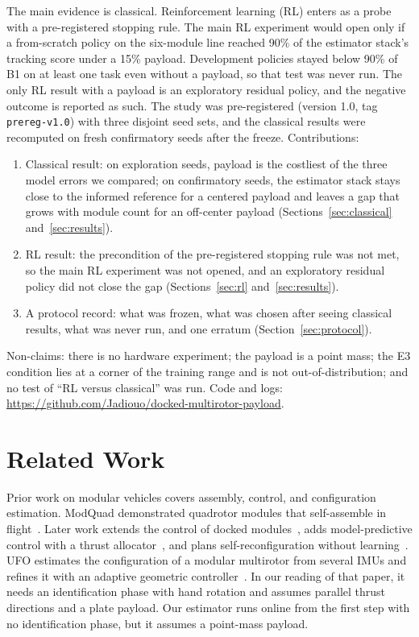 \documentclass[conference]{IEEEtran}
\begin{document}
The main evidence is classical.
Reinforcement learning (RL) enters as a probe with a pre-registered stopping rule.
The main RL experiment would open only if a from-scratch policy on the six-module line reached 90\% of the estimator stack's tracking score under a 15\% payload. %
Development policies stayed below 90\% of B1 on at least one task even without a payload, so that test was never run. %
The only RL result with a payload is an exploratory residual policy, and the negative outcome is reported as such.
The study was pre-registered (version 1.0, tag \texttt{prereg-v1.0}) with three disjoint seed sets, and the classical results were recomputed on fresh confirmatory seeds after the freeze. %
Contributions:
\begin{enumerate}
\item Classical result: on exploration seeds, payload is the costliest of the three model errors we compared; on confirmatory seeds, the estimator stack stays close to the informed reference for a centered payload and leaves a gap that grows with module count for an off-center payload (Sections~\ref{sec:classical} and~\ref{sec:results}).
\item RL result: the precondition of the pre-registered stopping rule was not met, so the main RL experiment was not opened, and an exploratory residual policy did not close the gap (Sections~\ref{sec:rl} and~\ref{sec:results}).
\item A protocol record: what was frozen, what was chosen after seeing classical results, what was never run, and one erratum (Section~\ref{sec:protocol}).
\end{enumerate}
Non-claims: there is no hardware experiment; the payload is a point mass; the E3 condition lies at a corner of the training range and is not out-of-distribution; and no test of ``RL versus classical'' was run.
Code and logs: \url{https://github.com/Jadiouo/docked-multirotor-payload}.

\section{Related Work}
Prior work on modular vehicles covers assembly, control, and configuration estimation.
ModQuad demonstrated quadrotor modules that self-assemble in flight~\cite{saldana2018modquad}.
Later work extends the control of docked modules~\cite{xu2025modular}, adds model-predictive control with a thrust allocator~\cite{huang2026mars}, and plans self-reconfiguration without learning~\cite{huang2025transformars}.
UFO estimates the configuration of a modular multirotor from several IMUs and refines it with an adaptive geometric controller~\cite{mu2020universal}.
In our reading of that paper, it needs an identification phase with hand rotation and assumes parallel thrust directions and a plate payload.
Our estimator runs online from the first step with no identification phase, but it assumes a point-mass payload.
\end{document}
